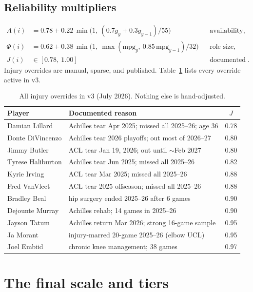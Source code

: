 \documentclass[11pt]{article}
\begin{document}
\subsection{Reliability multipliers}
\begin{align}
A(i) &= 0.78 + 0.22\, \min\!\bigl(1,\ (0.7 g_y + 0.3 g_{y-1})/55\bigr)
&&\text{availability},
\label{eq:avail}\\
\Phi(i) &= 0.62 + 0.38\, \min\!\bigl(1,\ \max(\mathrm{mpg}_y,\ 0.85\,\mathrm{mpg}_{y-1})/32\bigr)
&&\text{role size},
\label{eq:role}\\
J(i) &\in [0.78,\ 1.00]
&&\text{documented injury override}.
\label{eq:inj}
\end{align}
Injury overrides are manual, sparse, and published. Table~\ref{tab:inj} lists every
override active in v3.

\begin{table}[h]
\centering\small
\caption{All injury overrides in v3 (July 2026). Nothing else is hand-adjusted.}
\begin{tabular}{llc}
\toprule
Player & Documented reason & $J$ \\
\midrule
Damian Lillard & Achilles tear Apr 2025; missed all 2025--26; age 36 & 0.78 \\
Donte DiVincenzo & Achilles tear 2026 playoffs; out most of 2026--27 & 0.80 \\
Jimmy Butler & ACL tear Jan 19, 2026; out until $\sim$Feb 2027 & 0.80 \\
Tyrese Haliburton & Achilles tear Jun 2025; missed all 2025--26 & 0.82 \\
Kyrie Irving & ACL tear Mar 2025; missed all 2025--26 & 0.88 \\
Fred VanVleet & ACL tear 2025 offseason; missed all 2025--26 & 0.88 \\
Bradley Beal & hip surgery ended 2025--26 after 6 games & 0.90 \\
Dejounte Murray & Achilles rehab; 14 games in 2025--26 & 0.90 \\
Jayson Tatum & Achilles return Mar 2026; strong 16-game sample & 0.95 \\
Ja Morant & injury-marred 20-game 2025--26 (elbow UCL) & 0.95 \\
Joel Embiid & chronic knee management; 38 games & 0.97 \\
\bottomrule
\end{tabular}
\label{tab:inj}
\end{table}

\section{The final scale and tiers}
\end{document}
